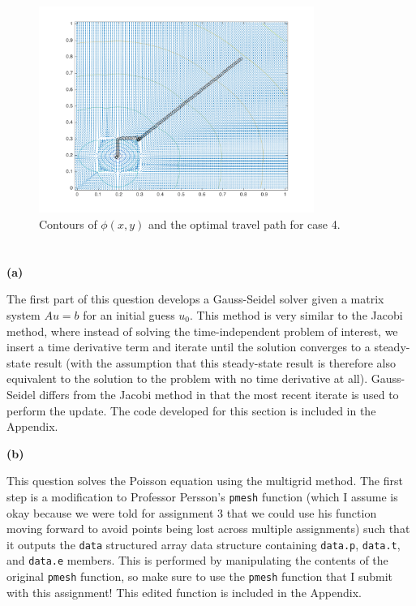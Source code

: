 \documentclass[10pt]{article}
\begin{document}
\begin{figure}[H]
\centering
\includegraphics[width=0.8\textwidth]{figures/case4.png}
\caption{Contours of \(\phi(x, y)\) and the optimal travel path for case 4.}
\label{fig:case4}
\end{figure}

\section{}

\textbf{(a)}

The first part of this question develops a Gauss-Seidel solver given a matrix system \(Au=b\) for an initial guess \(u_0\). This method is very similar to the Jacobi method, where instead of solving the time-independent problem of interest, we insert a time derivative term and iterate until the solution converges to a steady-state result (with the assumption that this steady-state result is therefore also equivalent to the solution to the problem with no time derivative at all). Gauss-Seidel differs from the Jacobi method in that the most recent iterate is used to perform the update. The code developed for this section is included in the Appendix.

\textbf{(b)}

This question solves the Poisson equation using the multigrid method. The first step is a modification to Professor Persson's {\tt pmesh} function (which I assume is okay because we were told for assignment 3 that we could use his function moving forward to avoid points being lost across multiple assignments) such that it outputs the {\tt data} structured array data structure containing {\tt data.p}, {\tt data.t}, and {\tt data.e} members. This is performed by manipulating the contents of the original {\tt pmesh} function, so make sure to use the {\tt pmesh} function that I submit with this assignment! This edited function is included in the Appendix.
\end{document}
